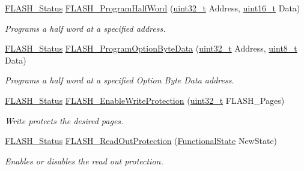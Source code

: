 \begin{DoxyCompactItemize}
\hyperlink{group___f_l_a_s_h___exported___types_gadc63a6f3404ff1f71229a66915e9cdc0}{F\+L\+A\+S\+H\+\_\+\+Status} \hyperlink{group___f_l_a_s_h___exported___functions_ga5c1336f667950a8765887228f1d0d501}{F\+L\+A\+S\+H\+\_\+\+Program\+Half\+Word} (\hyperlink{_p_e___types_8h_a33594304e786b158f3fb30289278f5af}{uint32\+\_\+t} Address, \hyperlink{_p_e___types_8h_a1f1825b69244eb3ad2c7165ddc99c956}{uint16\+\_\+t} Data)
\begin{DoxyCompactList}\small\item\em Programs a half word at a specified address. \end{DoxyCompactList}\item 
\hyperlink{group___f_l_a_s_h___exported___types_gadc63a6f3404ff1f71229a66915e9cdc0}{F\+L\+A\+S\+H\+\_\+\+Status} \hyperlink{group___f_l_a_s_h___exported___functions_ga1382ff9d4ded8a5c076fde4fff529d21}{F\+L\+A\+S\+H\+\_\+\+Program\+Option\+Byte\+Data} (\hyperlink{_p_e___types_8h_a33594304e786b158f3fb30289278f5af}{uint32\+\_\+t} Address, \hyperlink{_p_e___types_8h_aba7bc1797add20fe3efdf37ced1182c5}{uint8\+\_\+t} Data)
\begin{DoxyCompactList}\small\item\em Programs a half word at a specified Option Byte Data address. \end{DoxyCompactList}\item 
\hyperlink{group___f_l_a_s_h___exported___types_gadc63a6f3404ff1f71229a66915e9cdc0}{F\+L\+A\+S\+H\+\_\+\+Status} \hyperlink{group___f_l_a_s_h___exported___functions_gabad10c15e2d1ff1cb9e1083d08a9e763}{F\+L\+A\+S\+H\+\_\+\+Enable\+Write\+Protection} (\hyperlink{_p_e___types_8h_a33594304e786b158f3fb30289278f5af}{uint32\+\_\+t} F\+L\+A\+S\+H\+\_\+\+Pages)
\begin{DoxyCompactList}\small\item\em Write protects the desired pages. \end{DoxyCompactList}\item 
\hyperlink{group___f_l_a_s_h___exported___types_gadc63a6f3404ff1f71229a66915e9cdc0}{F\+L\+A\+S\+H\+\_\+\+Status} \hyperlink{group___f_l_a_s_h___exported___functions_ga0b8d1a8277950c890bbc247bbeafb40f}{F\+L\+A\+S\+H\+\_\+\+Read\+Out\+Protection} (\hyperlink{agilefox_2library_2inc_2stm32f10x__type_8h_ac9a7e9a35d2513ec15c3b537aaa4fba1}{Functional\+State} New\+State)
\begin{DoxyCompactList}\small\item\em Enables or disables the read out protection. \end{DoxyCompactList}\item 

\end{DoxyCompactItemize}
